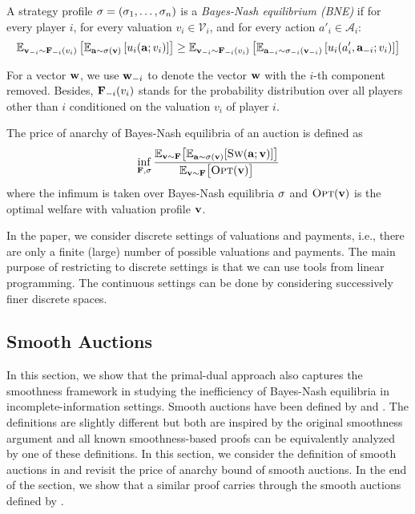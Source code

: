 \begin{theorem}
A strategy profile $\mathbf{\sigma} = (\sigma_{1}, \ldots, \sigma_{n})$ is a
\emph{Bayes-Nash equilibrium (BNE)}  if for every player $i$, for every valuation $v_{i} \in \mathcal{V}_{i}$, and
for every action $a'_{i} \in \mathcal{A}_{i}$:
\begin{align*}
\mathbb{E}_{\mathbf{v}_{-i} \sim \mathbf{F}_{-i}(v_{i})} \left[ \mathbb{E}_{\mathbf{a} \sim \mathbf{\sigma}(\mathbf{v})} \left[ u_{i}(\mathbf{a};v_{i}) \right] \right]
\geq
\mathbb{E}_{\mathbf{v}_{-i} \sim \mathbf{F}_{-i}(v_{i})} \left[ \mathbb{E}_{\mathbf{a}_{-i} \sim \mathbf{\sigma}_{-i}(\mathbf{v}_{-i})} \left[ u_{i}(a'_{i},\mathbf{a}_{-i};v_{i}) \right] \right]
\end{align*}
\end{theorem}
%
For a vector $\mathbf{w}$, we use $\mathbf{w}_{-i}$ to denote the vector $\mathbf{w}$ with the $i$-th component removed.
Besides, $\mathbf{F}_{-i}(v_{i})$ stands for the probability distribution over all players other than $i$
conditioned on the valuation $v_{i}$ of player $i$.

The price of anarchy of Bayes-Nash equilibria of an auction is defined as
$$
\inf_{\mathbf{F}, \mathbf{\sigma}} \frac{\mathbb{E}_{\mathbf{v} \sim \mathbf{F}}\bigl[ \mathbb{E}_{\mathbf{a} \sim \mathbf{\sigma}(\mathbf{v})}[\textsc{Sw}(\mathbf{a};\mathbf{v})] \bigr]}{\mathbb{E}_{\mathbf{v} \sim \mathbf{F}} \bigl[ \textsc{Opt}(\mathbf{v})\bigr]}
$$
where the infimum is taken over Bayes-Nash equilibria $\mathbf{\sigma}$ and
$\textsc{Opt}(\mathbf{v})$ is the optimal welfare with valuation profile $\mathbf{v}$.

In the paper, we consider discrete settings of valuations and payments, i.e.,
there are only a finite (large) number of possible valuations
and payments. The main purpose of restricting to discrete settings is that we can use tools from linear programming.
The continuous settings can be done by considering successively finer discrete spaces.


\subsection{Smooth Auctions}	\label{sec:smooth-auction}

In this section, we show that the primal-dual approach also captures the smoothness framework in
studying the inefficiency of Bayes-Nash equilibria in incomplete-information settings.
Smooth auctions have been defined by \citet{Roughgarden15:The-price-of-anarchy}
and \citet{SyrgkanisTardos13:Composable-and-efficient}. The definitions are slightly different but both are inspired
by the original smoothness argument \cite{Roughgarden15:Intrinsic-robustness} and
all known smoothness-based proofs can be equivalently analyzed by one of these definitions.
In this section, we consider the definition of smooth auctions in \cite{Roughgarden15:The-price-of-anarchy}
and revisit the price of anarchy bound of smooth auctions.
In the end of the section, we show that a similar proof carries through the smooth auctions defined by
\citet{SyrgkanisTardos13:Composable-and-efficient}.


